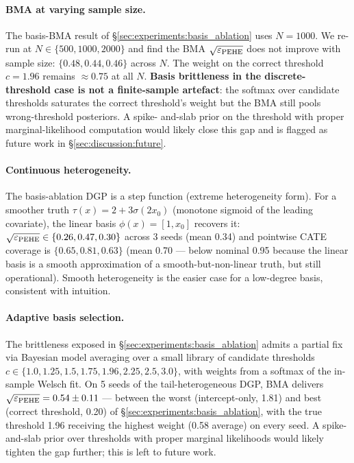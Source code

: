 \paragraph{BMA at varying sample size.}
The basis-BMA result of \S\ref{sec:experiments:basis_ablation} uses
$N = 1000$. We re-run at $N \in \{500, 1000, 2000\}$ and find
the BMA $\sqrt{\varepsilon_{\mathrm{PEHE}}}$ does not improve with sample size: $\{0.48, 0.44,
0.46\}$ across $N$. The weight on the correct threshold $c = 1.96$
remains $\approx 0.75$ at all $N$. \textbf{Basis brittleness in the
discrete-threshold case is not a finite-sample artefact}: the
softmax over candidate thresholds saturates the correct threshold's
weight but the BMA still pools wrong-threshold posteriors. A spike-
and-slab prior on the threshold with proper marginal-likelihood
computation would likely close this gap and is flagged as future
work in \S\ref{sec:discussion:future}.

\paragraph{Continuous heterogeneity.}
The basis-ablation DGP is a step function (extreme heterogeneity
form). For a smoother truth $\tau(x) = 2 + 3 \sigma(2 x_0)$
(monotone sigmoid of the leading covariate), the linear basis
$\phi(x) = [1, x_0]$ recovers it: $\sqrt{\varepsilon_{\mathrm{PEHE}}} \in \{0.26, 0.47, 0.30\}$
across 3 seeds (mean 0.34) and pointwise CATE coverage is
$\{0.65, 0.81, 0.63\}$ (mean 0.70 --- below nominal 0.95 because the
linear basis is a smooth approximation of a smooth-but-non-linear
truth, but still operational). Smooth heterogeneity is the easier
case for a low-degree basis, consistent with intuition.

\paragraph{Adaptive basis selection.}
The brittleness exposed in \S\ref{sec:experiments:basis_ablation}
admits a partial fix via Bayesian model averaging over a small
library of candidate thresholds $c \in \{1.0, 1.25, 1.5, 1.75,
1.96, 2.25, 2.5, 3.0\}$, with weights from a softmax of the
in-sample Welsch fit. On 5 seeds of the tail-heterogeneous DGP,
BMA delivers $\sqrt{\varepsilon_{\mathrm{PEHE}}} = 0.54 \pm 0.11$ --- between the worst
(intercept-only, 1.81) and best (correct threshold, 0.20) of
\S\ref{sec:experiments:basis_ablation}, with the true threshold
1.96 receiving the highest weight (0.58 average) on every seed.
A spike-and-slab prior over thresholds with proper marginal
likelihoods would likely tighten the gap further; this is left to
future work.

